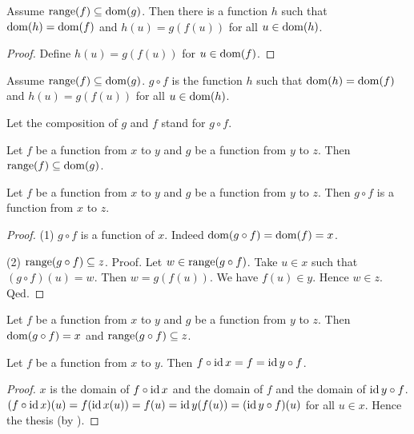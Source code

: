\documentclass[../../set-theory.ftl.tex]{subfiles}
\begin{document}
  \begin{forthel}
    \begin{lemma}
      Assume $\operatorname{range}(f) \subseteq \operatorname{dom}(g)$.
      Then there is a function $h$ such that $\operatorname{dom}(h) = \operatorname{dom}(f)$ and $h(u) = g(f(u))$ for all $u \in \operatorname{dom}(h)$.
    \end{lemma}
    \begin{proof}
      Define $h(u) = g(f(u))$ for $u \in \operatorname{dom}(f)$.
    \end{proof}

    \begin{definition}
      Assume $\operatorname{range}(f) \subseteq \operatorname{dom}(g)$.
      $g \circ f$ is the function $h$ such that $\operatorname{dom}(h) = \operatorname{dom}(f)$ and $h(u) = g(f(u))$ for all $u \in \operatorname{dom}(h)$.
    \end{definition}

    Let the composition of $g$ and $f$ stand for $g \circ f$.

    \begin{lemma}
      Let $f$ be a function from $x$ to $y$ and $g$ be a function from $y$ to $z$.
      Then $\operatorname{range}(f) \subseteq \operatorname{dom}(g)$.
    \end{lemma}

    \begin{proposition}\label{SetTheory_02_01_289732}
      Let $f$ be a function from $x$ to $y$ and $g$ be a function from $y$ to $z$.
      Then $g \circ f$ is a function from $x$ to $z$.
    \end{proposition}
    \begin{proof}
      (1) $g \circ f$ is a function of $x$.
      Indeed $\operatorname{dom}(g \circ f) = \operatorname{dom}(f) = x$.

      (2) $\operatorname{range}(g \circ f) \subseteq z$.
      Proof.
        Let $w \in \operatorname{range}(g \circ f)$.
        Take $u \in x$ such that $(g \circ f)(u) = w$.
        Then $w = g(f(u))$.
        We have $f(u) \in y$.
        Hence $w \in z$.
      Qed.
    \end{proof}

    \begin{lemma}
      Let $f$ be a function from $x$ to $y$ and $g$ be a function from $y$ to $z$.
      Then $\operatorname{dom}(g \circ f) = x$ and $\operatorname{range}(g \circ f) \subseteq z$.
    \end{lemma}

    \begin{proposition}\label{SetTheory_02_01_718601}
      Let $f$ be a function from $x$ to $y$.
      Then $f \circ \operatorname{id}{x} = f = \operatorname{id}{y} \circ f$.
    \end{proposition}
    \begin{proof}
      $x$ is the domain of $f \circ \operatorname{id}{x}$ and the domain of $f$ and the domain of $\operatorname{id}{y} \circ f$.
      $(f \circ \operatorname{id}{x})(u) = f(\operatorname{id}{x}(u)) = f(u) = \operatorname{id}{y}(f(u)) = (\operatorname{id}{y} \circ f)(u)$ for all $u \in x$.
      Hence the thesis (by ).
    \end{proof}


\end{forthel}
\end{document}

